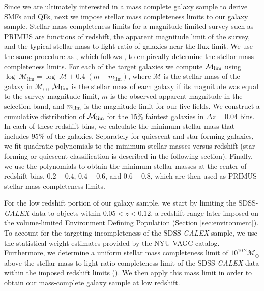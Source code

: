 \documentclass{emulateapj}
\begin{document}
Since we are ultimately interested in a mass complete galaxy sample to
derive SMFs and QFs, next we impose stellar mass completeness limits
to our galaxy sample.
Stellar mass completeness limits for a magnitude-limited survey such as PRIMUS are functions of redshift, the apparent magnitude limit of the survey, and the typical stellar mass-to-light ratio of galaxies near the flux limit. We use the same procedure as \cite{Moustakas:2013aa}, which follows \cite{Pozzetti:2010aa}, to empircally determine the stellar mass completeness limits. For each of the target galaxies we compute $\mathcal{M}_{\rm{lim}}$ using $\log \; \mathcal{M}_{\mathrm{lim}} = \log \; \mathcal{M} + 0.4\;(m - m_{\mathrm{lim}})$, where $\mathcal{M}$ is the stellar mass of the galaxy in $\mathcal{M_{\odot}}$, $\mathcal{M}_{\rm{lim}}$ is the stellar mass of each galaxy if its magnitude was equal to the survey magnitude limit, $m$ is the observed apparent magnitude in the selection band, and $m_{\rm{lim}}$ is the magnitude limit for our five fields. We construct a cumulative distribution of $\mathcal{M}_{\rm{lim}}$ for the $15\%$ faintest galaxies in $\Delta z=0.04$ bins. In each of these redshift bins, we calculate the minimum stellar mass that includes $95 \%$ of the galaxies. Separately for quiescent and star-forming galaxies, we fit quadratic polynomials to the minimum stellar masses versus redshift (star-forming or quiescent classification is described in the following section). Finally, we use the polynomials to obtain the minimum stellar masses at the center of redshift bins, $0.2-0.4$, $0.4-0.6$, and $0.6-0.8$, which are then used as PRIMUS stellar mass completeness limits.

For the low redshift portion of our galaxy sample, we start by limiting the SDSS-{\em GALEX} data to objects within $0.05 < z < 0.12$, a redshift range later imposed on the volume-limited Environment Defining Population (Section \ref{sec:environment}). To account for the targeting incompleteness of the SDSS-{\em GALEX} sample, we use the statistical weight estimates provided by the NYU-VAGC catalog. Furthermore, we determine a uniform stellar mass completeness limit of $10^{10.2} \mathcal{M}_{\odot}$ above the stellar mass-to-light ratio completeness limit of the SDSS-{\em GALEX} data within the imposed redshift limits (\citealt{Blanton:2005ab, Baldry:2008aa, Moustakas:2013aa}). We then apply this mass limit in order to obtain our mass-complete galaxy sample at low redshift. 
\end{document}
